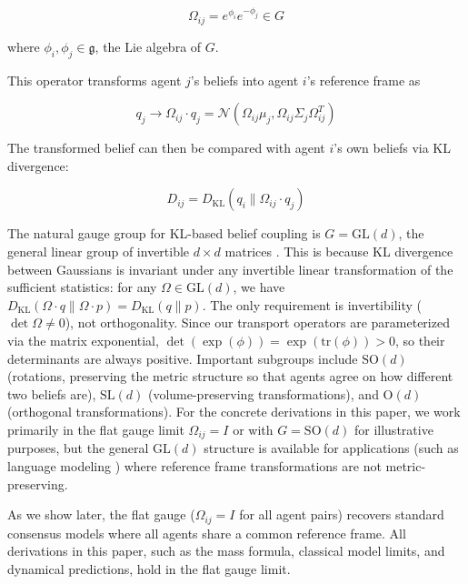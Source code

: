 \documentclass[12pt]{article}
\begin{document}
\begin{equation}
\Omega_{ij} = e^{\phi_i}e^{-\phi_j} \in G
\end{equation}

where $\phi_i, \phi_j \in \mathfrak{g}$, the Lie algebra of $G$.

This operator transforms agent $j$'s beliefs into agent $i$'s reference frame as

\begin{equation}
q_j \to \Omega_{ij} \cdot q_j = \mathcal{N}(\Omega_{ij}\mu_j, \Omega_{ij}\Sigma_j\Omega_{ij}^T)
\end{equation}

The transformed belief can then be compared with agent $i$'s own beliefs via KL divergence:

\begin{equation}
D_{ij} = D_{\mathrm{KL}}(q_i \| \Omega_{ij} \cdot q_j)
\end{equation}

The natural gauge group for KL-based belief coupling is $G = \mathrm{GL}(d)$, the general linear group of invertible $d \times d$ matrices \citep{Dennis2025trans}. This is because KL divergence between Gaussians is invariant under any invertible linear transformation of the sufficient statistics: for any $\Omega \in \mathrm{GL}(d)$, we have $D_{\mathrm{KL}}(\Omega \cdot q \| \Omega \cdot p) = D_{\mathrm{KL}}(q \| p)$. The only requirement is invertibility ($\det \Omega \neq 0$), not orthogonality. Since our transport operators are parameterized via the matrix exponential, $\det(\exp(\phi)) = \exp(\mathrm{tr}(\phi)) > 0$, so their determinants are always positive. Important subgroups include $\mathrm{SO}(d)$ (rotations, preserving the metric structure so that agents agree on how different two beliefs are), $\mathrm{SL}(d)$ (volume-preserving transformations), and $\mathrm{O}(d)$ (orthogonal transformations). For the concrete derivations in this paper, we work primarily in the flat gauge limit $\Omega_{ij} = I$ or with $G = \mathrm{SO}(d)$ for illustrative purposes, but the general $\mathrm{GL}(d)$ structure is available for applications (such as language modeling \citep{Dennis2025trans}) where reference frame transformations are not metric-preserving.

As we show later, the flat gauge ($\Omega_{ij} = I$ for all agent pairs) recovers standard consensus models where all agents share a common reference frame. All derivations in this paper, such as the mass formula, classical model limits, and dynamical predictions, hold in the flat gauge limit.
\end{document}
